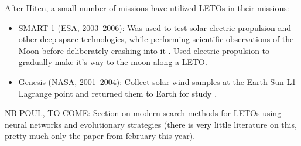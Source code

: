 After Hiten, a small number of missions have utilized LETOs in their missions:
\begin{itemize}
	\item SMART-1 (ESA, 2003--2006): Was used to test solar electric propulsion and other deep-space technologies, while performing scientific observations of the Moon before deliberately crashing into it \cite{ESA}. Used electric propulsion to gradually make it's way to the moon along a LETO.
    \item Genesis (NASA, 2001--2004): Collect solar wind samples at the Earth-Sun L1 Lagrange point and returned them to Earth for study \cite{NASAa}.
\end{itemize}

NB POUL, TO COME: Section on modern search methods for LETOs using neural networks and evolutionary strategies (there is very little literature on this, pretty much only the paper from february this year).
